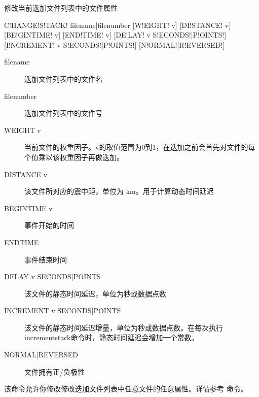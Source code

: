 \label{sss:changestack}

修改当前迭加文件列表中的文件属性

\begin{SACSTX}
C!HANGE!S!TACK! filename|filenumber [W!EIGHT! v] [DI!STANCE! v] [BE!GINTIME! v]
    [END!TIME! v] [DE!LAY! v S!ECONDS!|P!OINTS!] [I!NCREMENT! v S!ECONDS!|P!OINTS!]
    [N!ORMAL!|R!EVERSED!]
\end{SACSTX}

\begin{description}
\item [filename] 迭加文件列表中的文件名
\item [filenumber] 迭加文件列表中的文件号
\item [WEIGHT v] 当前文件的权重因子。v的取值范围为0到1，在迭加之前会首先对文件的每个值乘以该权重因子再做迭加。
\item [DISTANCE v] 该文件所对应的震中距，单位为 \si{\km}。用于计算动态时间延迟
\item [BEGINTIME v] 事件开始的时间
\item [ENDTIME] 事件结束时间
\item [DELAY v SECONDS|POINTS] 该文件的静态时间延迟，单位为秒或数据点数
\item [INCREMENT v SECONDS|POINTS] 该文件的静态时间延迟增量，单位为秒或数据点数。在每次执行incrementstack命令时，静态时间延迟会增加一个常数。
\item [NORMAL|REVERSED] 文件拥有正/负极性
\end{description}

该命令允许你修改修改迭加文件列表中任意文件的任意属性。详情参考  命令。
